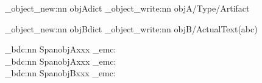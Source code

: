 \documentclass{article}
\begin{document}
\ExplSyntaxOn
\pdf_object_new:nn   {objA}{dict}
\pdf_object_write:nn {objA}{/Type/Artifact}

\pdf_object_new:nn   {objB}{dict}
\pdf_object_write:nn {objB}{/ActualText(abc)}

\vspace*{44\baselineskip}
\pdf_bdc:nn {Span}{objA}xxx
\pdf_emc:
\\
\pdf_bdc:nn {Span}{objA}xxx
\pdf_emc:
\\
\pdf_bdc:nn {Span}{objB}xxx
\pdf_emc:

\ExplSyntaxOff
\end{document}
